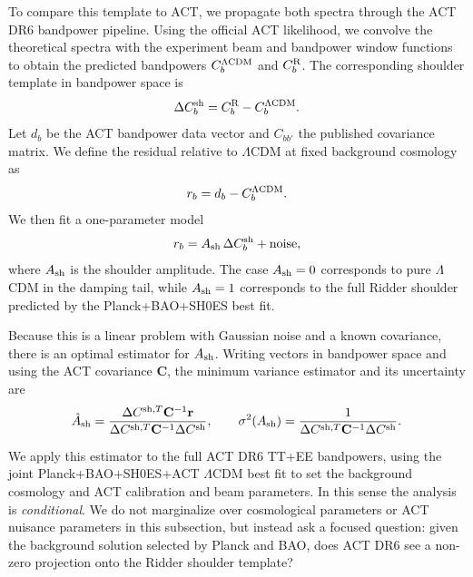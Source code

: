 \documentclass[a4paper,11pt]{article}
\begin{document}
To compare this template to ACT, we propagate both spectra through the ACT DR6 bandpower pipeline. Using the official ACT likelihood, we convolve the theoretical spectra with the experiment beam and bandpower window functions to obtain the predicted bandpowers $C_b^{\Lambda{\rm CDM}}$ and $C_b^{\rm R}$. The corresponding shoulder template in bandpower space is
\begin{equation}
\Delta C_b^{\rm sh} = C_b^{\rm R} - C_b^{\Lambda{\rm CDM}}.
\end{equation}
Let $d_b$ be the ACT bandpower data vector and $C_{bb'}$ the published covariance matrix. We define the residual relative to $\Lambda$CDM at fixed background cosmology as
\begin{equation}
r_b = d_b - C_b^{\Lambda{\rm CDM}}.
\end{equation}
We then fit a one-parameter model
\begin{equation}
r_b = A_{\rm sh}\,\Delta C_b^{\rm sh} + \text{noise},
\end{equation}
where $A_{\rm sh}$ is the shoulder amplitude. The case $A_{\rm sh}=0$ corresponds to pure $\Lambda$CDM in the damping tail, while $A_{\rm sh}=1$ corresponds to the full Ridder shoulder predicted by the Planck+BAO+SH0ES best fit.

Because this is a linear problem with Gaussian noise and a known covariance, there is an optimal estimator for $A_{\rm sh}$. Writing vectors in bandpower space and using the ACT covariance $\mathbf{C}$, the minimum variance estimator and its uncertainty are
\begin{equation}
\hat A_{\rm sh} = \frac{\Delta C^{{\rm sh},T} \mathbf{C}^{-1} \mathbf{r}}{\Delta C^{{\rm sh},T} \mathbf{C}^{-1} \Delta C^{\rm sh}}, \qquad
\sigma^2(A_{\rm sh}) = \frac{1}{\Delta C^{{\rm sh},T} \mathbf{C}^{-1} \Delta C^{\rm sh}}.
\end{equation}

We apply this estimator to the full ACT DR6 TT+EE bandpowers, using the joint Planck+BAO+SH0ES+ACT $\Lambda$CDM best fit to set the background cosmology and ACT calibration and beam parameters. In this sense the analysis is \emph{conditional}. We do not marginalize over cosmological parameters or ACT nuisance parameters in this subsection, but instead ask a focused question: given the background solution selected by Planck and BAO, does ACT DR6 see a non-zero projection onto the Ridder shoulder template?
\end{document}
